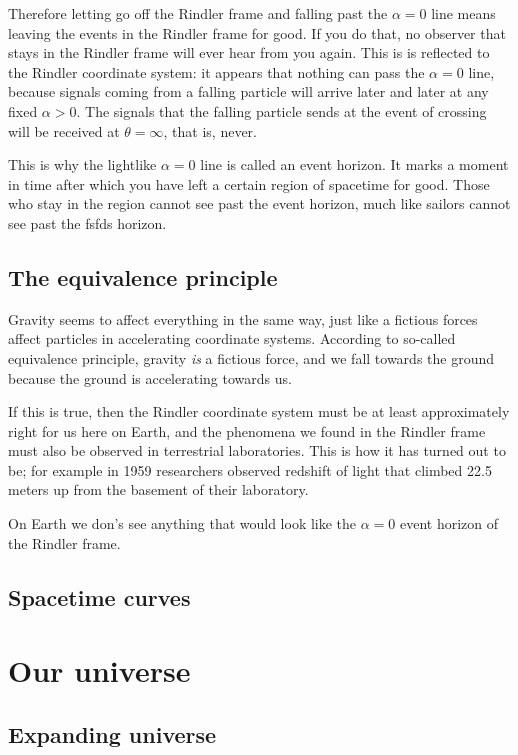 \documentclass[11pt,oneside%
]{memoir}
\begin{document}
Therefore letting go off the Rindler frame and falling past the \(\alpha=0\) line means leaving the events in the Rindler frame for good. If you do that, no observer that stays in the Rindler frame will ever hear from you again. This is is reflected to the Rindler coordinate system: it appears that nothing can pass the \(\alpha=0\) line, because signals coming from a falling particle will arrive later and later at any fixed \(\alpha>0\). The signals that the falling particle sends at the event of crossing will be received at \(\theta=\infty\), that is, never.

This is why the lightlike \(\alpha=0\) line is called an event horizon. It marks a moment in time after which you have left a certain region of spacetime for good. Those who stay in the region cannot see past the event horizon, much like sailors cannot see past the fsfds horizon.

\section{The equivalence principle}

Gravity seems to affect everything in the same way, just like a fictious forces affect particles in accelerating coordinate systems. According to so-called equivalence principle, gravity \emph{is} a fictious force, and we fall towards the ground because the ground is accelerating towards us.

If this is true, then the Rindler coordinate system must be at least approximately right for us here on Earth, and the phenomena we found in the Rindler frame must also be observed in terrestrial laboratories. This is how it has turned out to be; for example in 1959 researchers observed redshift of light that climbed 22.5 meters up from the basement of their laboratory.

On Earth we don's see anything that would look like the \(\alpha=0\) event horizon of the Rindler frame. 


\section{Spacetime curves}

\chapter{Our universe}

\section{Expanding universe}
\end{document}
